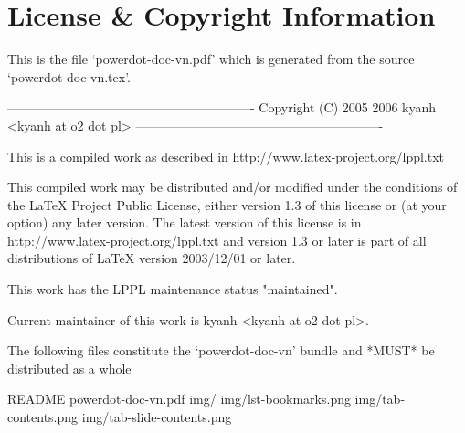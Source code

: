 \section*{License \& Copyright Information}

\vspace{3cm}
\begin{example}
 This is the file `powerdot-doc-vn.pdf'
 which is generated from the source `powerdot-doc-vn.tex'.

 ----------------------------------------------------------
 Copyright (C) 2005 2006 kyanh <kyanh at o2 dot pl>
 ----------------------------------------------------------

 This is a compiled work as described in
 	http://www.latex-project.org/lppl.txt

 This compiled work may be distributed and/or modified under the
 conditions of the LaTeX Project Public License, either version 1.3
 of this license or (at your option) any later version.
 The latest version of this license is in
	http://www.latex-project.org/lppl.txt
 and version 1.3 or later is part of all distributions of LaTeX
 version 2003/12/01 or later.

 This work has the LPPL maintenance status "maintained".

 Current maintainer of this work is kyanh <kyanh at o2 dot pl>.
 
 The following files constitute the `powerdot-doc-vn' bundle
 and *MUST* be distributed as a whole
 
  README
  powerdot-doc-vn.pdf
  img/
  img/lst-bookmarks.png
  img/tab-contents.png
  img/tab-slide-contents.png
\end{example}
\endinput

